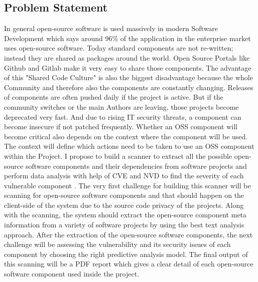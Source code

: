 \subsection{Problem Statement}
In general open-source software is used massively in modern Software Development which says around 96\% of the application in the enterprise market uses open-source software\cite{Gilad}. Today standard components are not re-written; instead they are shared as packages around the world. Open Source Portals like Github and Gitlab make it very easy to share those components. The advantage of this "Shared Code Culture" is also the biggest disadvantage because the whole Community and therefore also the components are constantly changing. Releases of components are often pushed daily if the project is active. But if the community switches or the main Authors are leaving, those projects become deprecated very fast. And due to rising IT security threats, a component can become insecure if not patched frequently. Whether an \acs{OSS} component will become critical also depends on the context where the component will be used. The context will define which actions need to be taken to use an \acs{OSS} component within the Project. I propose to build a scanner to extract all the possible open-source software components and their dependencies from software projects and perform data analysis with help of \acs{CVE} and \acs{NVD} to find the severity of each vulnerable component \cite{RaLo2016}. The very first challenge for building this scanner will be scanning for open-source software components and that should happen on the client-side of the system due to the source code privacy of the projects. Along with the scanning, the system should extract the open-source component meta information from a variety of software projects by using the best text analysis approach. After the extraction of the open-source software components, the next challenge will be assessing the vulnerability and its security issues of each component by choosing the right predictive analysis model. The final output of this scanning will be a PDF report which gives a clear detail of each open-source software component used inside the project.